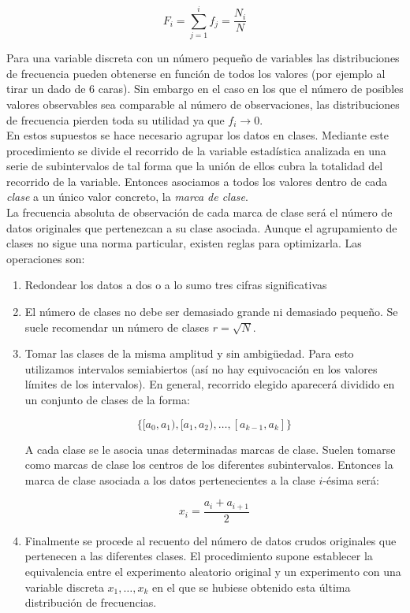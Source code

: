 \documentclass[12pt,a4paper]{book}
\begin{document}
\begin{equation}
F_i = \sum_{j=1}^i f_j = \dfrac{N_i}{N}
\end{equation}


Para una variable discreta con un número pequeño de variables las distribuciones de frecuencia pueden obtenerse en función de todos los valores (por ejemplo al tirar un dado de 6 caras). Sin embargo en el caso en los que el número de posibles valores observables sea comparable al número de observaciones, las distribuciones de frecuencia pierden toda su utilidad ya que $f_i \rightarrow 0$. \\

En estos supuestos se hace necesario agrupar los datos en clases. Mediante este procedimiento se divide el recorrido de la variable estadística analizada en una serie de subintervalos de tal forma que la unión de ellos cubra la totalidad del recorrido de la variable. Entonces asociamos a todos los valores dentro de cada \textit{clase} a un único valor concreto, la \textit{marca de clase}. \\

La frecuencia absoluta de observación de cada marca de clase será el número de datos originales que pertenezcan a su clase asociada. Aunque el agrupamiento de clases no sigue una norma particular, existen reglas para optimizarla. Las operaciones son:

\begin{enumerate}
\item Redondear los datos a dos o a lo sumo tres cifras significativas

\item El número de clases no debe ser demasiado grande ni demasiado pequeño. Se suele recomendar un número de clases $r = \sqrt{N}$. 

\item Tomar las clases de la misma amplitud y sin ambigüedad. Para esto utilizamos intervalos semiabiertos (así no hay equivocación en los valores límites de los intervalos). En general, recorrido elegido aparecerá dividido en un conjunto de clases de la forma:

$$ \{ [a_0,a_1), [a_1,a_2), \ldots, [a_{k-1}, a_k] \} $$



A cada clase se le asocia unas determinadas marcas de clase. Suelen tomarse como marcas de clase los centros de los diferentes subintervalos. Entonces la marca de clase asociada a los datos pertenecientes a la clase $i$-ésima será:

$$ x_i = \dfrac{a_i + a_{i+1}}{2} $$

\item Finalmente se procede al recuento del número de datos crudos originales que pertenecen a las diferentes clases. El procedimiento supone establecer la equivalencia entre el experimento aleatorio original y un experimento con una variable discreta ${x_1, \ldots, x_k}$ en el que se hubiese obtenido esta última distribución de frecuencias. 

\end{enumerate}
\end{document}
